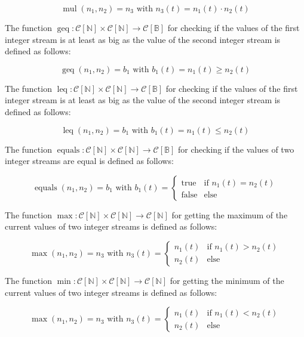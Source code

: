\[\operatorname{mul}(n_1,n_2) = n_3 \text{ with } n_3(t) = n_1(t) \cdot n_2(t)\]

The function $\operatorname{geq}: \mathcal{C}[\mathbb{N}] \times \mathcal{C}[\mathbb{N}] \rightarrow \mathcal{C}[\mathbb{B}]$ for checking if the values of the first integer stream is at least as big as the value of the second integer stream is defined as follows:

\[\operatorname{geq}(n_1,n_2) = b_1 \text{ with } b_1(t) = n_1(t) \geq n_2(t)\]

The function $\operatorname{leq}: \mathcal{C}[\mathbb{N}] \times \mathcal{C}[\mathbb{N}] \rightarrow \mathcal{C}[\mathbb{B}]$ for checking if the values of the first integer stream is at least as big as the value of the second integer stream is defined as follows:

\[\operatorname{leq}(n_1,n_2) = b_1 \text{ with } b_1(t) = n_1(t) \leq n_2(t)\]

The function $\operatorname{equals}: \mathcal{C}[\mathbb{N}] \times \mathcal{C}[\mathbb{N}] \rightarrow \mathcal{C}[\mathbb{B}]$ for checking if the values of two integer streams are equal is defined as follows:

\[\operatorname{equals}(n_1,n_2) = b_1 \text{ with } b_1(t) = \begin{cases}
\text{true} & \text{if } n_1(t) = n_2(t) \\
\text{false} & \text{else}
\end{cases}\]

The function $\operatorname{max}: \mathcal{C}[\mathbb{N}] \times \mathcal{C}[\mathbb{N}] \rightarrow \mathcal{C}[\mathbb{N}]$ for getting the maximum of the current values of two integer streams is defined as follows:

\[\operatorname{max}(n_1,n_2) = n_3 \text{ with } n_3(t) = \begin{cases}
n_1(t) & \text{if } n_1(t) > n_2(t) \\
n_2(t) & \text{else}
\end{cases}\]

The function $\operatorname{min}: \mathcal{C}[\mathbb{N}] \times \mathcal{C}[\mathbb{N}] \rightarrow \mathcal{C}[\mathbb{N}]$ for getting the minimum of the current values of two integer streams is defined as follows:

\[\operatorname{max}(n_1,n_2) = n_3 \text{ with } n_3(t) = \begin{cases}
n_1(t) & \text{if } n_1(t) < n_2(t) \\
n_2(t) & \text{else}
\end{cases}\]

